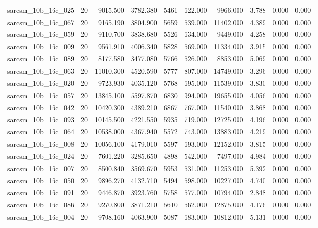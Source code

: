 \begin{tabular}{lrrrrrrrrr}
sarcsm\_10b\_16c\_025 & 20 & 9015.500 & 3782.380 & 5461 & 622.000 & 9966.000 & 3.788 & 0.000 & 0.000 \\
sarcsm\_10b\_16c\_067 & 20 & 9165.190 & 3804.900 & 5659 & 639.000 & 11402.000 & 4.389 & 0.000 & 0.000 \\
sarcsm\_10b\_16c\_059 & 20 & 9110.700 & 3838.680 & 5526 & 634.000 & 9449.000 & 4.258 & 0.000 & 0.000 \\
sarcsm\_10b\_16c\_009 & 20 & 9561.910 & 4006.340 & 5828 & 669.000 & 11334.000 & 3.915 & 0.000 & 0.000 \\
sarcsm\_10b\_16c\_089 & 20 & 8177.580 & 3477.080 & 5766 & 626.000 & 8853.000 & 5.069 & 0.000 & 0.000 \\
sarcsm\_10b\_16c\_063 & 20 & 11010.300 & 4520.590 & 5777 & 807.000 & 14749.000 & 3.296 & 0.000 & 0.000 \\
sarcsm\_10b\_16c\_020 & 20 & 9723.930 & 4035.120 & 5768 & 695.000 & 11539.000 & 3.830 & 0.000 & 0.000 \\
sarcsm\_10b\_16c\_057 & 20 & 13845.100 & 5597.870 & 6830 & 994.000 & 19655.000 & 4.056 & 0.000 & 0.000 \\
sarcsm\_10b\_16c\_042 & 20 & 10420.300 & 4389.210 & 6867 & 767.000 & 11540.000 & 3.868 & 0.000 & 0.000 \\
sarcsm\_10b\_16c\_093 & 20 & 10145.500 & 4221.550 & 5935 & 719.000 & 12725.000 & 4.196 & 0.000 & 0.000 \\
sarcsm\_10b\_16c\_064 & 20 & 10538.000 & 4367.940 & 5572 & 743.000 & 13883.000 & 4.219 & 0.000 & 0.000 \\
sarcsm\_10b\_16c\_008 & 20 & 10056.100 & 4179.010 & 5597 & 693.000 & 12152.000 & 3.815 & 0.000 & 0.000 \\
sarcsm\_10b\_16c\_024 & 20 & 7601.220 & 3285.650 & 4898 & 542.000 & 7497.000 & 4.984 & 0.000 & 0.000 \\
sarcsm\_10b\_16c\_007 & 20 & 8500.840 & 3569.670 & 5953 & 631.000 & 11253.000 & 5.392 & 0.000 & 0.000 \\
sarcsm\_10b\_16c\_050 & 20 & 9896.270 & 4132.710 & 5494 & 698.000 & 10227.000 & 4.740 & 0.000 & 0.000 \\
sarcsm\_10b\_16c\_091 & 20 & 9446.870 & 3923.760 & 5758 & 677.000 & 10794.000 & 2.848 & 0.000 & 0.000 \\
sarcsm\_10b\_16c\_086 & 20 & 9270.800 & 3871.210 & 5610 & 662.000 & 12875.000 & 4.176 & 0.000 & 0.000 \\
sarcsm\_10b\_16c\_004 & 20 & 9708.160 & 4063.900 & 5087 & 683.000 & 10812.000 & 5.131 & 0.000 & 0.000 \\

\end{tabular}
